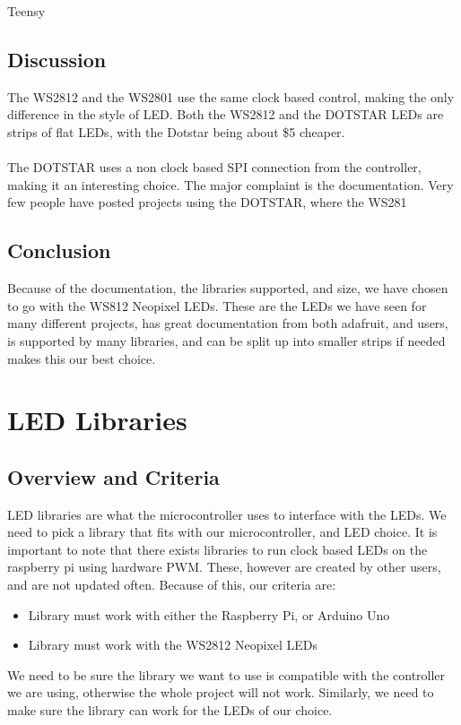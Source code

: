 Teensy\documentclass[onecolumn, draftclsnofoot,10pt, compsoc]{IEEEtran}
\begin{document}
		\subsection{Discussion}
		The WS2812 and the WS2801 use the same clock based control, making the only
		difference in the style of LED. Both the WS2812 and the DOTSTAR LEDs are
		strips of flat LEDs, with the Dotstar being about \$5 cheaper.
		\\\\
		The DOTSTAR uses a non clock based SPI connection from the controller,
		making it an interesting choice. The major complaint is the documentation.
		Very few people have posted projects using the DOTSTAR, where the WS281
		\subsection{Conclusion}
		Because of the documentation, the libraries supported, and size, we have
		chosen to go with the WS812 Neopixel LEDs. These are the LEDs we have
		seen for many different projects, has great documentation from both
		adafruit, and users, is supported by many libraries, and can be split up
		into smaller strips if needed makes this our best choice.

	\section{LED Libraries}
		\subsection{Overview and Criteria}
		LED libraries are what the microcontroller uses to interface with the LEDs.
		We need to pick a library that fits with our microcontroller, and LED
		choice. It is important to note that there exists libraries to run
		clock based LEDs on the raspberry pi using hardware PWM. These, however
		are created by other users, and are not updated often. Because of this, our
		criteria are:
		\begin{itemize}
			\item Library must work with either the Raspberry Pi, or Arduino Uno
			\item Library must work with the WS2812 Neopixel LEDs
		\end{itemize}
		We need to be sure the library we want to use is compatible with the
		controller we are using, otherwise the whole project will not work.
		Similarly, we need to make sure the library can work for the LEDs of our
		choice.
\end{document}
